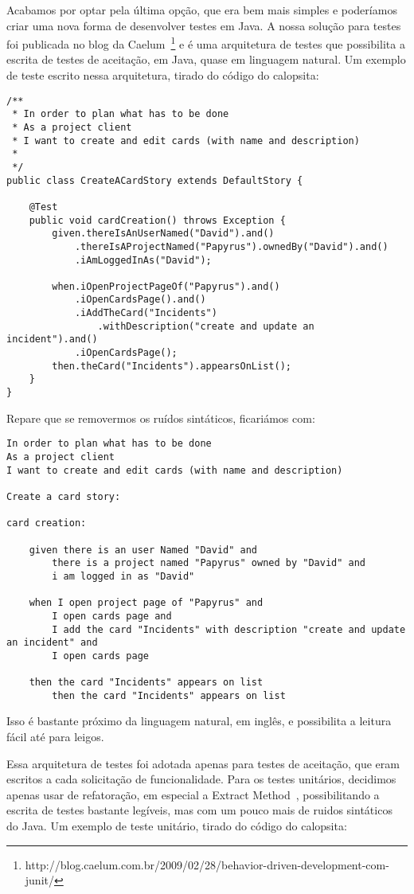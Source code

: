 Acabamos por optar pela última opção, que era bem mais simples e poderíamos criar uma nova forma de desenvolver 
testes em Java. A nossa solução para testes foi publicada no blog da Caelum~\footnote{http://blog.caelum.com.br/2009/02/28/behavior-driven-development-com-junit/} e é uma arquitetura de 
testes que possibilita a escrita de testes de aceitação, em Java, quase em linguagem natural. Um exemplo de teste 
escrito nessa arquitetura, tirado do código do calopsita:

\begin{lstlisting}
/**
 * In order to plan what has to be done
 * As a project client
 * I want to create and edit cards (with name and description)
 *
 */
public class CreateACardStory extends DefaultStory {

	@Test
	public void cardCreation() throws Exception {
		given.thereIsAnUserNamed("David").and()
			.thereIsAProjectNamed("Papyrus").ownedBy("David").and()
			.iAmLoggedInAs("David");

		when.iOpenProjectPageOf("Papyrus").and()
		    .iOpenCardsPage().and()
			.iAddTheCard("Incidents")
				.withDescription("create and update an incident").and()
			.iOpenCardsPage();
		then.theCard("Incidents").appearsOnList();
	}
}
\end{lstlisting}

Repare que se removermos os ruídos sintáticos, ficariámos com:

\begin{verbatim}
In order to plan what has to be done
As a project client
I want to create and edit cards (with name and description)

Create a card story:

card creation:
	
	given there is an user Named "David" and
		there is a project named "Papyrus" owned by "David" and
		i am logged in as "David"

	when I open project page of "Papyrus" and
		I open cards page and
		I add the card "Incidents" with description "create and update an incident" and
		I open cards page
			
	then the card "Incidents" appears on list
		then the card "Incidents" appears on list
\end{verbatim}

Isso é bastante próximo da linguagem natural, em inglês, e possibilita a leitura fácil até para leigos.

Essa arquitetura de testes foi adotada apenas para testes de aceitação, que eram escritos a cada solicitação de
funcionalidade. Para os testes unitários, decidimos apenas usar de refatoração, em especial a Extract Method~\cite{refactoring}, possibilitando a escrita de testes bastante
legíveis, mas com um pouco mais de ruidos sintáticos do Java. Um exemplo de teste unitário, tirado do código do calopsita:

